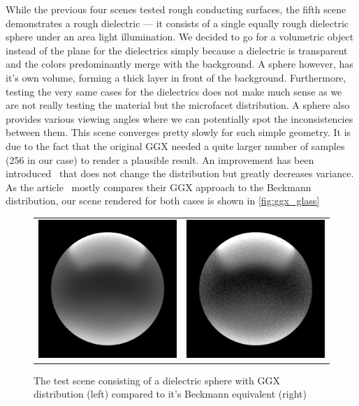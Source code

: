 While the previous four scenes tested rough conducting surfaces, the fifth scene demonstrates a rough dielectric --- it consists of a single equally rough dielectric sphere under an area light illumination. We decided to go for a volumetric object instead of the plane for the dielectrics simply because a dielectric is transparent and the colors predominantly merge with the background. A sphere however, has it's own volume, forming a thick layer in front of the background. Furthermore, testing the very same cases for the dielectrics does not make much sense as we are not really testing the material but the microfacet distribution. A sphere also provides various viewing angles where we can potentially spot the inconsistencies between them. This scene converges pretty slowly for such simple geometry. It is due to the fact that the original GGX needed a quite larger number of samples (256 in our case) to render a plausible result. An improvement has been introduced~\cite{heitz2018sampling} that does not change the distribution but greatly decreases variance. As the article~\cite{walter2007microfacet} mostly compares their GGX approach to the Beckmann distribution, our scene rendered for both cases is shown in \autoref{fig:ggx_glass}

\begin{figure}[h]
	\begin{tabular}{cc}
		\includegraphics[width=.45\linewidth]{img/ggx_glass.png}
		&
		\includegraphics[width=.45\linewidth]{img/beckmann_glass.png}
	\end{tabular}
	\caption{The test scene consisting of a dielectric sphere with GGX distribution (left) compared to it's Beckmann equivalent (right)}
	\label{fig:ggx_glass}
\end{figure}

